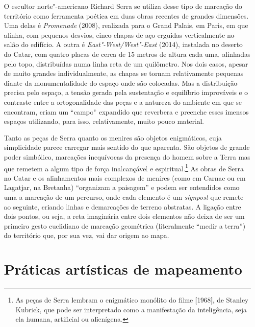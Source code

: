 O escultor norte"-americano Richard Serra se utiliza desse tipo de marcação do território
como ferramenta poética em duas obras recentes de grandes dimensões. Uma
delas é \emph{Promenade} (2008), realizada para o Grand Palais, em
Paris, em que alinha, com pequenos desvios, cinco chapas de aço erguidas
verticalmente no salão do edifício. A outra é \emph{East"-West/West"-East}
(2014), instalada no deserto do Catar, com quatro placas de cerca de 15
metros de altura cada uma, alinhadas pelo topo, distribuídas numa linha
reta de um quilômetro. Nos dois casos, apesar de muito grandes
individualmente, as chapas se tornam relativamente pequenas diante da
monumentalidade do espaço onde são colocadas. Mas a distribuição precisa
pelo espaço, a tensão gerada pela sustentação e equilíbrio improváveis e
o contraste entre a ortogonalidade das peças e a natureza do ambiente em
que se encontram, criam um ``campo'' expandido que reverbera e preenche
esses imensos espaços utilizando, para isso, relativamente, muito pouco
material.

Tanto as peças de Serra quanto os menires são objetos enigmáticos, cuja
simplicidade parece carregar mais sentido do que aparenta. São objetos
de grande poder simbólico, marcações inequívocas da presença do homem
sobre a Terra mas que remetem a algum tipo de força inalcançável e
espiritual.\footnote{As peças de Serra lembram o enigmático monólito do
  filme {} {[}1968{]}, de Stanley
  Kubrick, que pode ser interpretado como a manifestação da
  inteligência, seja ela humana, artificial ou alienígena.} As obras de
Serra no Catar e os alinhamentos mais complexos de menires (como em
Carnac ou em Lagatjar, na Bretanha) ``organizam a paisagem'' e podem ser
entendidos como uma a marcação de um percurso, onde cada elemento é um
\emph{signpost} que remete ao seguinte, criando linhas e demarcações de
terreno abstratas. A ligação entre dois pontos, ou seja, a reta
imaginária entre dois elementos não deixa de ser um primeiro gesto
euclidiano de marcação geométrica (literalmente ``medir a terra'') do
território que, por sua vez, vai dar origem ao mapa.


\part{Práticas artísticas de mapeamento}
\removeepigraph

